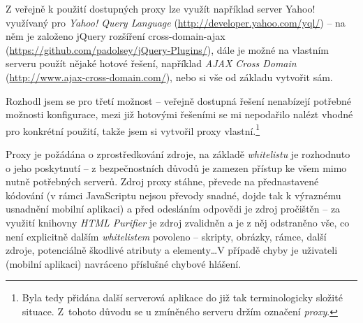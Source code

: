Z veřejně k použití dostupných proxy lze využít například server Yahoo! využívaný pro \textit{Yahoo! Query Language} (\url{http://developer.yahoo.com/yql/}) -- na něm je založeno jQuery rozšíření cross-domain-ajax (\url{https://github.com/padolsey/jQuery-Plugins/}), dále je možné na vlastním serveru použít nějaké hotové řešení, například \textit{AJAX Cross Domain} (\url{http://www.ajax-cross-domain.com/}), nebo si vše od základu vytvořit sám.

Rozhodl jsem se pro třetí možnost -- veřejně dostupná řešení nenabízejí potřebné možnosti konfigurace, mezi již hotovými řešeními se mi nepodařilo nalézt vhodné pro konkrétní použití, takže jsem si vytvořil proxy vlastní.\footnote{Byla tedy přidána další serverová aplikace do již tak terminologicky složité situace. Z~tohoto důvodu se u zmíněného serveru držím označení \textit{proxy}.}

Proxy je požádána o zprostředkování zdroje, na základě \textit{whitelistu} je rozhodnuto o jeho poskytnutí -- z bezpečnostních důvodů je zamezen přístup ke všem mimo nutně potřebných serverů. Zdroj proxy stáhne, převede na přednastavené kódování (v rámci JavaScriptu nejsou převody snadné, dojde tak k výraznému usnadnění mobilní aplikaci) a před odesláním odpovědi je zdroj pročištěn -- za využití knihovny \textit{HTML Purifier} je zdroj zvalidněn a je z něj odstraněno vše, co není explicitně dalším \textit{whitelistem} povoleno -- skripty, obrázky, rámce, další zdroje, potenciálně škodlivé atributy a elementy\dots V případě chyby je uživateli (mobilní aplikaci) navráceno příslušné chybové hlášení.

